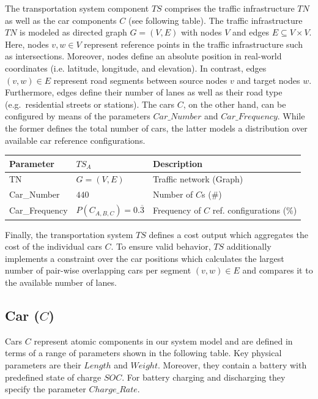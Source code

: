 The transportation system component $TS$ comprises the traffic infrastructure $TN$ as well as the car components $C$ (see following table). The traffic infrastructure $TN$ is modeled as directed graph $G = (V,E)$ with nodes $V$ and edges $E \subseteq V \times V$. Here, nodes $v,w \in V$ represent reference points in the traffic infrastructure such as intersections. Moreover, nodes define an absolute position in real-world coordinates (i.e. latitude, longitude, and elevation). In contrast, edges $(v,w) \in E$ represent road segments between source nodes $v$ and target nodes $w$. Furthermore, edges define their number of lanes as well as their road type (e.g.\ residential streets or stations). The cars $C$, on the other hand, can be configured by means of the parameters $Car\_Number$ and $Car\_Frequency$. While the former defines the total number of cars, the latter models a distribution over available car reference configurations. 

\begin{table}[h]
	\renewcommand{\arraystretch}{1.3}
	\centering
	\begin{tabularx}{\columnwidth}{llX}
		\hline
		\textbf{Parameter}     & \textbf{$TS_{A}$}         & \textbf{Description} \\ \hline
		TN              & $G = (V, E)$    & Traffic network (Graph)    \\
		Car\_Number            & $440$    & Number of $C$s (\#)      \\ 
		Car\_Frequency      & $P(C_{A,B,C}) = 0.\overline{3}$    & Frequency of $C$ ref. configurations (\%)       \\ \hline
	\end{tabularx}
\end{table}

Finally, the transportation system $TS$ defines a cost output which aggregates the cost of the individual cars $C$. To ensure valid behavior, $TS$ additionally implements a constraint over the car positions which calculates the largest number of pair-wise overlapping cars per segment $(v,w) \in E$ and compares it to the available number of lanes.

\subsection{Car ($C$)}
\label{section:car}

Cars $C$ represent atomic components in our system model and are defined in terms of a range of parameters shown in the following table. Key physical parameters are their $Length$ and $Weight$. Moreover, they contain a battery with predefined state of charge $SOC$. For battery charging and discharging they specify the parameter $Charge\_Rate$.

